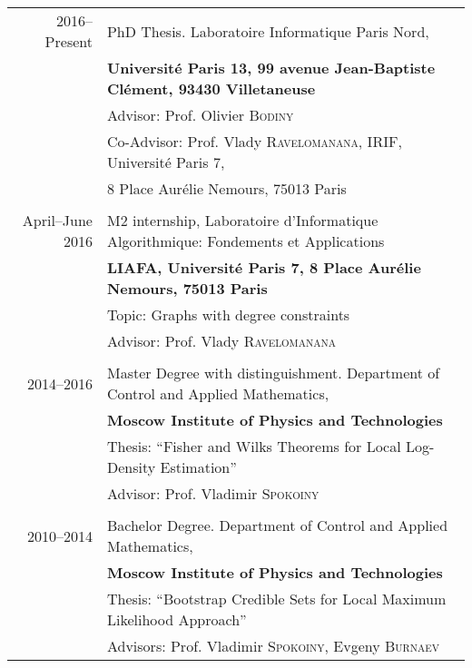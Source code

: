 \documentclass[a4paper,10pt]{article} %
\begin{document}
\begin{tabular}{rl}	
2016--Present & PhD Thesis. Laboratoire Informatique Paris Nord,\\
& \textbf{Université Paris 13, 99 avenue
Jean-Baptiste Clément, 93430 Villetaneuse}\\
& Advisor: Prof. Olivier \textsc{Bodiny}\\
& Co-Advisor: Prof. Vlady \textsc{Ravelomanana}, IRIF, Université Paris 7,\\& 8
Place Aurélie Nemours, 75013 Paris\\
&\\

April--June 2016 & M2 internship, Laboratoire d'Informatique Algorithmique:
Fondements et Applications \\
& \textbf{LIAFA, Université Paris 7, 8
Place Aurélie Nemours, 75013 Paris}\\
& Topic: Graphs with degree constraints\\
& Advisor: Prof. Vlady \textsc{Ravelomanana}\\
&\\

2014--2016 & Master Degree with distinguishment. Department of Control and Applied Mathematics,\\
& \textbf{Moscow Institute of Physics and Technologies}\\
& Thesis: ``Fisher and Wilks Theorems for Local Log-Density Estimation''\\
& Advisor: Prof. Vladimir \textsc{Spokoiny}\\
&\\


%

2010--2014 & Bachelor Degree. Department of Control and Applied Mathematics, \\
& \textbf{Moscow Institute of Physics and Technologies}\\
& Thesis: ``Bootstrap Credible Sets for Local Maximum Likelihood Approach''\\
& Advisors: Prof. Vladimir \textsc{Spokoiny}, Evgeny \textsc{Burnaev}\\
\end{tabular}
\end{document}
